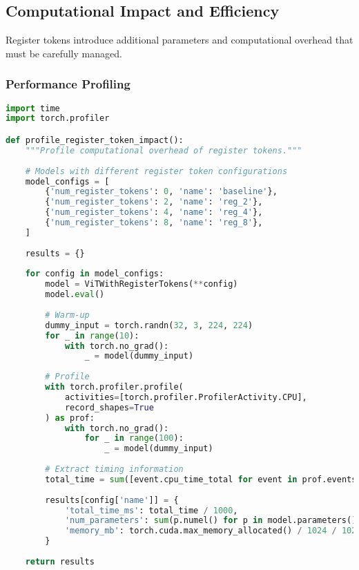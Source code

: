 \subsection{Computational Impact and Efficiency}

Register tokens introduce additional parameters and computational overhead that must be carefully managed.

\subsubsection{Performance Profiling}

\begin{lstlisting}[language=Python, caption=Profiling computational impact of register tokens]
import time
import torch.profiler

def profile_register_token_impact():
    """Profile computational overhead of register tokens."""
    
    # Models with different register token configurations
    model_configs = [
        {'num_register_tokens': 0, 'name': 'baseline'},
        {'num_register_tokens': 2, 'name': 'reg_2'},
        {'num_register_tokens': 4, 'name': 'reg_4'},
        {'num_register_tokens': 8, 'name': 'reg_8'},
    ]
    
    results = {}
    
    for config in model_configs:
        model = ViTWithRegisterTokens(**config)
        model.eval()
        
        # Warm-up
        dummy_input = torch.randn(32, 3, 224, 224)
        for _ in range(10):
            with torch.no_grad():
                _ = model(dummy_input)
        
        # Profile
        with torch.profiler.profile(
            activities=[torch.profiler.ProfilerActivity.CPU],
            record_shapes=True
        ) as prof:
            with torch.no_grad():
                for _ in range(100):
                    _ = model(dummy_input)
        
        # Extract timing information
        total_time = sum([event.cpu_time_total for event in prof.events()])
        
        results[config['name']] = {
            'total_time_ms': total_time / 1000,
            'num_parameters': sum(p.numel() for p in model.parameters()),
            'memory_mb': torch.cuda.max_memory_allocated() / 1024 / 1024 if torch.cuda.is_available() else 0
        }
    
    return results


\end{lstlisting}
